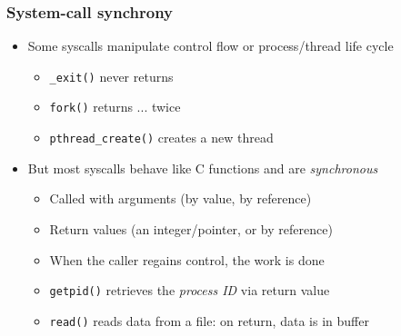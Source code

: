 \begin{frame}
  \frametitle{System-call synchrony}

  \begin{itemize}
    \item Some syscalls manipulate control flow or process/thread life cycle
    \begin{itemize}
      \item \texttt{\_exit()} never returns
      \item \texttt{fork()} returns ... twice
      \item \texttt{pthread\_create()} creates a new thread
    \end{itemize}

    \pause
    \medskip

    \item But most syscalls behave like C functions and are \textit{synchronous}
    \begin{itemize}
      \item Called with arguments (by value, by reference)
      \item Return values (an integer/pointer, or by reference)
      \item When the caller regains control, the work is done
      \item \texttt{getpid()} retrieves the \textit{process ID} via return value
      \item \texttt{read()} reads data from a file: on return, data is in buffer
    \end{itemize}
  \end{itemize}
\end{frame}

